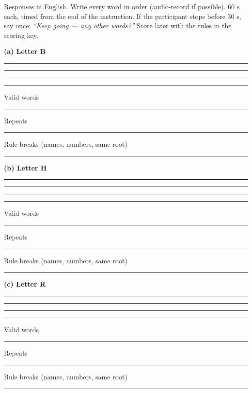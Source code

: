 \documentclass[10pt,a4paper]{article}
\newcommand{\blank}[1][1.2cm]{\rule{#1}{0.4pt}}
\begin{document}
Responses in English. Write every word in order (audio-record if possible). 60 s each, timed from the end of the instruction. If the participant stops before 30 s, say once: \textit{``Keep going --- any other words?''} Score later with the rules in the scoring key.
\par{}\medskip\textbf{(a) Letter B}\par\vspace{2pt}\blank[\linewidth]\par\vspace{9pt}\blank[\linewidth]\par\vspace{9pt}\blank[\linewidth]\par\vspace{9pt}\blank[\linewidth]\par\vspace{9pt}
Valid words \blank\quad Repeats \blank\quad Rule breaks (names, numbers, same root) \blank\par
\par{}\medskip\textbf{(b) Letter H}\par\vspace{2pt}\blank[\linewidth]\par\vspace{9pt}\blank[\linewidth]\par\vspace{9pt}\blank[\linewidth]\par\vspace{9pt}\blank[\linewidth]\par\vspace{9pt}
Valid words \blank\quad Repeats \blank\quad Rule breaks (names, numbers, same root) \blank\par
\par{}\medskip\textbf{(c) Letter R}\par\vspace{2pt}\blank[\linewidth]\par\vspace{9pt}\blank[\linewidth]\par\vspace{9pt}\blank[\linewidth]\par\vspace{9pt}\blank[\linewidth]\par\vspace{9pt}
Valid words \blank\quad Repeats \blank\quad Rule breaks (names, numbers, same root) \blank\par
\end{document}
